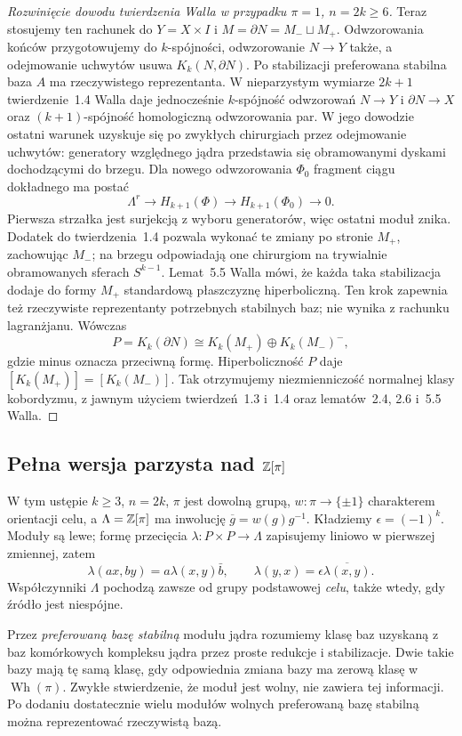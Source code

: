 \begin{proof}[Rozwinięcie dowodu twierdzenia Walla w przypadku
 $\pi=1$, $n=2k\geq6$]
Teraz stosujemy ten rachunek do
$Y=X\times I$ i $M=\partial N=M_-\sqcup M_+$.
Odwzorowania końców przygotowujemy do
$k$-spójności, odwzorowanie $N\to Y$ także,
a odejmowanie uchwytów usuwa
$K_k(N,\partial N)$. Po stabilizacji
preferowana stabilna baza $A$ ma
rzeczywistego reprezentanta.
W nieparzystym wymiarze $2k+1$
twierdzenie~1.4 Walla daje jednocześnie
$k$-spójność odwzorowań $N\to Y$ i $\partial N\to X$
oraz $(k+1)$-spójność homologiczną odwzorowania par.
W jego dowodzie ostatni warunek uzyskuje się
po zwykłych chirurgiach przez odejmowanie
uchwytów: generatory względnego jądra
przedstawia się obramowanymi dyskami
dochodzącymi do brzegu. Dla nowego odwzorowania
$\Phi_0$ fragment ciągu dokładnego ma postać
\[
 \Lambda^r\longrightarrow H_{k+1}(\Phi)
 \longrightarrow H_{k+1}(\Phi_0)\longrightarrow0.
\]
Pierwsza strzałka jest surjekcją z wyboru
generatorów, więc ostatni moduł znika.
Dodatek do twierdzenia~1.4 pozwala wykonać
te zmiany po stronie $M_+$, zachowując $M_-$;
na brzegu odpowiadają one chirurgiom na
trywialnie obramowanych sferach $S^{k-1}$.
Lemat~5.5 Walla mówi, że każda taka
stabilizacja dodaje do formy $M_+$ standardową
płaszczyznę hiperboliczną. Ten krok zapewnia
też rzeczywiste reprezentanty potrzebnych
stabilnych baz; nie wynika z rachunku
lagranżjanu. Wówczas
\[
 P=K_k(\partial N)
 \cong K_k(M_+)\oplus K_k(M_-)^{-},
\]
gdzie minus oznacza przeciwną formę.
Hiperboliczność $P$ daje
$[K_k(M_+)]=[K_k(M_-)]$.
Tak otrzymujemy niezmienniczość
normalnej klasy kobordyzmu, z jawnym
użyciem twierdzeń~1.3 i~1.4 oraz
lematów~2.4, 2.6 i~5.5 Walla.
\end{proof}

\subsection*{Pełna wersja parzysta nad \texorpdfstring{$\mathbb{Z}[\pi]$}{Z[pi]}}

W tym ustępie $k\geq3$, $n=2k$, $\pi$ jest dowolną grupą,
$w:\pi\to\{\pm1\}$ charakterem orientacji celu, a
$\Lambda=\mathbb{Z}[\pi]$ ma inwolucję
$\overline g=w(g)g^{-1}$. Kładziemy
$\epsilon=(-1)^k$. Moduły są lewe; formę przecięcia
$\lambda:P\times P\to\Lambda$ zapisujemy liniowo w pierwszej
zmiennej, zatem
\[
 \lambda(ax,by)=a\lambda(x,y)\bar b,
 \qquad \lambda(y,x)=\epsilon\overline{\lambda(x,y)}.
\]
Współczynniki $\Lambda$ pochodzą zawsze od grupy podstawowej
\emph{celu}, także wtedy, gdy źródło jest niespójne.

Przez \emph{preferowaną bazę stabilną} modułu jądra rozumiemy
klasę baz uzyskaną z baz komórkowych kompleksu jądra przez
proste redukcje i stabilizacje. Dwie takie bazy mają tę samą
klasę, gdy odpowiednia zmiana bazy ma zerową klasę
w $\operatorname{Wh}(\pi)$. Zwykłe stwierdzenie, że moduł jest
wolny, nie zawiera tej informacji. Po dodaniu dostatecznie wielu
modułów wolnych preferowaną bazę stabilną można reprezentować
rzeczywistą bazą.

